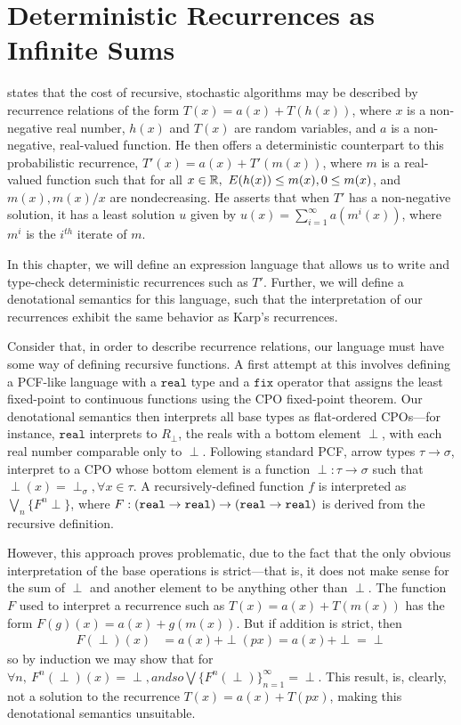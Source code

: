 \chapter{Deterministic Recurrences as Infinite Sums}
\cite[\S1]{Karp} states that the  cost of recursive, stochastic algorithms may 
be described by recurrence relations of the form $T(x) = a(x) + T(h(x))$, where $x$ is a non-negative real number, $h(x)$ 
and $T(x)$ are 
random variables, and $a$ is a non-negative, real-valued function. He then offers a deterministic counterpart to this
probabilistic recurrence, $T'(x) = a(x) + T'(m(x))$, where $m$ is a real-valued function such that for all
$ x \in \mathbb{R}, \ E(h(x)) \leq m(x) , 0 \leq m(x)$, and $m(x), m(x)/x$ are nondecreasing. He asserts that when $T'$ has a
non-negative solution, it has a least solution $u$ given by $u(x) = \sum_{i=1}^{\infty}a(m^i(x))$, where 
$m^i$ is the $i^{th}$ iterate of $m$. 

In this chapter, we will define an expression language that allows us to write and type-check
deterministic recurrences such as $T'$. Further, we will define a denotational semantics for this language, 
such that the interpretation of our recurrences exhibit the same behavior as Karp's recurrences. 

Consider that, in order to describe recurrence relations, our language must have some way of defining recursive functions.
A first attempt at this involves defining a PCF-like language with a $\texttt{real}$ type and a $\texttt{fix}$ operator
that assigns the least fixed-point to continuous functions using the CPO fixed-point theorem. Our denotational semantics 
then interprets all base types as flat-ordered CPOs---for instance, $\texttt{real}$  interprets to $R_{\perp}$, the reals with a 
bottom element $\perp$, with each real number comparable only to $\perp$. Following standard PCF, arrow types
$\tau \rightarrow \sigma$, interpret to a CPO whose bottom element is a function $\perp: \tau \rightarrow \sigma$ such
that $\perp(x) = \perp_{\sigma}, \forall x \in \tau$. A recursively-defined function $f$ is interpreted as 
$\bigvee_n\{F^n \perp\}$, where $F: (\texttt{real} \rightarrow \texttt{real}) \rightarrow (\texttt{real} \rightarrow \texttt{real})$ is derived from
the recursive definition.

However, this approach proves problematic, due to the fact that the only obvious interpretation of the base operations is strict---that is, it does not make sense for the 
sum of $\perp$ and another element to be anything other than $\perp$. The function $F$ used to interpret a recurrence
such as $T(x) = a(x) + T(m(x))$ has the form $F(g)(x) = a(x) + g(m(x))$. But if addition is strict, then 
\begin{align*}
F(\perp)(x) &= a(x) + \perp(px) = a(x) + \perp = \perp 
\end{align*}
so by induction we may show that for $\forall n, \ F^n(\perp)(x) = \perp, and so \bigvee\{F^n(\perp)\}^{\infty}_{n=1}  = \perp$. 
This result, is, clearly, not a solution to the recurrence $T(x) = a(x) + T(px)$, making this denotational semantics
unsuitable. 

